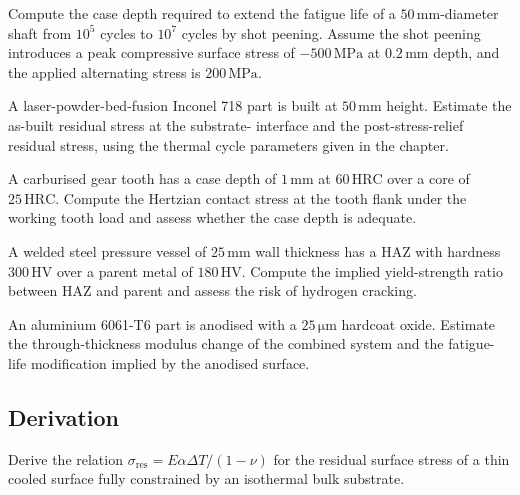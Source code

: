 \begin{exercise}
Compute the case depth required to extend the fatigue life of a
$50\,\text{mm}$-diameter shaft from $10^5$ cycles to $10^7$ cycles by
shot peening. Assume the shot peening introduces a peak compressive
surface stress of $-500\,\text{MPa}$ at $0.2\,\text{mm}$ depth, and
the applied alternating stress is $200\,\text{MPa}$.
\end{exercise}

\begin{exercise}
A laser-powder-bed-fusion Inconel 718 part is built at $50\,\text{mm}$
height. Estimate the as-built residual stress at the substrate-
interface and the post-stress-relief residual stress, using the
thermal cycle parameters given in the chapter.
\end{exercise}

\begin{exercise}
A carburised gear tooth has a case depth of $1\,\text{mm}$ at
$60\,\text{HRC}$ over a core of $25\,\text{HRC}$. Compute the
Hertzian contact stress at the tooth flank under the working tooth
load and assess whether the case depth is adequate.
\end{exercise}

\begin{exercise}
A welded steel pressure vessel of $25\,\text{mm}$ wall thickness has
a HAZ with hardness $300\,\text{HV}$ over a parent metal of
$180\,\text{HV}$. Compute the implied yield-strength ratio between
HAZ and parent and assess the risk of hydrogen cracking.
\end{exercise}

\begin{exercise}
An aluminium 6061-T6 part is anodised with a $25\,\si{\micro\meter}$
hardcoat oxide. Estimate the through-thickness modulus change of the
combined system and the fatigue-life modification implied by the
anodised surface.
\end{exercise}

\subsection*{Derivation}

\begin{exercise}
Derive the relation $\sigma_{\text{res}} = E \alpha \Delta T / (1 -
\nu)$ for the residual surface stress of a thin cooled surface fully
constrained by an isothermal bulk substrate.
\end{exercise}

